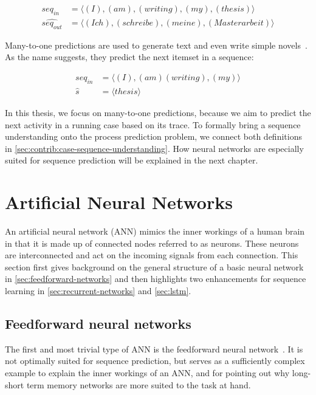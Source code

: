 \begin{equation*}
\begin{split}
seq_{in} &= \langle(I),(am),(writing),(my),(thesis)\rangle\\
\widehat{seq_{out}} &= \langle(Ich),(schreibe),(meine),(Masterarbeit)\rangle
\end{split}
\end{equation*}

Many-to-one predictions are used to generate text and even write simple novels~\cite{web:text-generation-machinelearningmastery, web:text-generation-freecodecamp}. As the name suggests, they predict the next itemset in a sequence:

\begin{equation*}
\begin{split}
seq_{in}  &= \langle(I),(am) (writing),(my)\rangle\\
\hat{s} &= \langle thesis\rangle
\end{split}
\end{equation*}

In this thesis, we focus on many-to-one predictions, because we aim to predict the next activity in a running case based on its trace. To formally bring a sequence understanding onto the process prediction problem, we connect both definitions in \autoref{sec:contrib:case-sequence-understanding}. How neural networks are especially suited for sequence prediction will be explained in the next chapter.

\section{Artificial Neural Networks}\label{sec:artificial-neural-networks}
An artificial neural network (ANN) mimics the inner workings of a human brain in that it is made up of connected nodes referred to as neurons. These neurons are interconnected and act on the incoming signals from each connection. This section first gives background on the general structure of a basic neural network in \autoref{sec:feedforward-networks} and then highlights two enhancements for sequence learning in \autoref{sec:recurrent-networks} and \autoref{sec:lstm}.

\subsection{Feedforward neural networks}\label{sec:feedforward-networks}
The first and most trivial type of ANN is the feedforward neural network~\cite{schmidhuber2015deep}. It is not optimally suited for sequence prediction, but serves as a sufficiently complex example to explain the inner workings of an ANN, and for pointing out why long-short term memory networks are more suited to the task at hand.

